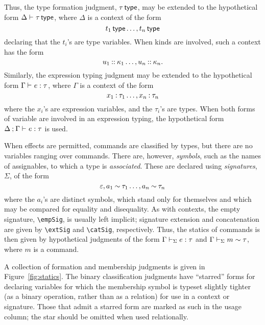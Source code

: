 \documentclass[11pt]{article}
\begin{document}
Thus, the type formation judgment, $\isTp{\tau}$, may be extended to the hypothetical form $\Delta\entails\isTp{\tau}$, where $\Delta$ is a context of the form
\[
    \extCtx{\isTp{t_1}\dots}{\isTp{t_n}}
\]
declaring that the $t_i$'s are type variables.  When kinds are involved, such a context has the form
\[
    \extCtx{\isOfKd*{u_1}{\kappa_1}\dots}{\isOfKd*{u_n}{\kappa_n}}.
\]
Similarly, the expression typing judgment may be extended to the hypothetical form $\Gamma\entails \isOf{e}{\tau}$, where $\Gamma$ is a context of the form
\[
    \extCtx{\isOf*{x_1}{\tau_1}\dots}{\isOf*{x_n}{\tau_n}}
\]
where the $x_i$'s are expression variables, and the $\tau_i$'s are types.  When both forms of variable are involved in an expression typing, the hypothetical form $\sepCtx{\Delta}{\Gamma}\entails \isOf{e}{\tau}$ is used.

When effects are permitted, commands are classified by types, but there are no variables ranging over commands.  There are, however, \emph{symbols}, such as the names of assignables, to which a type is \emph{associated}.  These are declared using \emph{signatures}, $\Sigma$, of the form
\[
    \extSig{\extSig{\empSig}{\hasTp*{a_1}{\tau_1}}\dots}{\hasTp*{a_n}{\tau_n}}
\]
where the $a_i$'s are distinct symbols, which stand only for themselves and which may be compared for equality and disequality.  As with contexts, the empty signature, \verb|\empSig|, is usually left implicit; signature extension and concatenation are given by \verb|\extSig| and \verb|\catSig|, respectively.  Thus, the statics of commands is then given by hypothetical judgments of the form $\Gamma\entails[\Sigma] \isOf{e}{\tau}$ and $\Gamma\entails[\Sigma] \hasTp{m}{\tau}$, where $m$ is a command.

\smallskip

A collection of formation and membership judgments is given in Figure~\ref{fig:statics}.  The binary classification judgments have ``starred'' forms for declaring variables for which the membership symbol is typeset slightly tighter (as a binary operation, rather than as a relation) for use in a context or signature.  Those that admit a starred form are marked as such in the usage column; the star should be omitted when used relationally.
\end{document}
